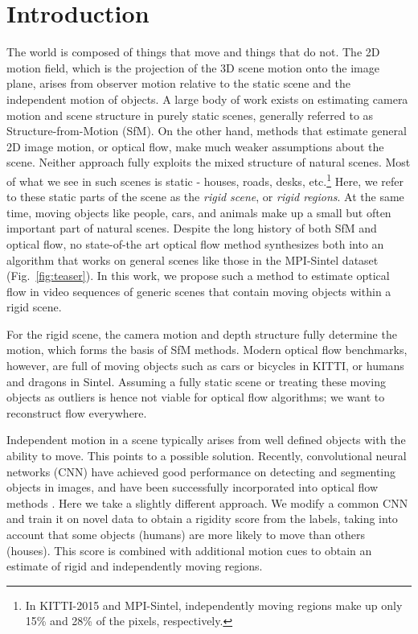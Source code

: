 \documentclass[10pt,twocolumn,letterpaper]{article}
\begin{document}
 \section{Introduction}
\noindent
The world is composed of things that move and things that do not.
The 2D motion field, which is the projection of the 3D scene motion onto the image plane, arises from observer motion relative to the static scene and the independent motion of objects.
A large body of work exists on estimating camera motion and scene structure in purely static scenes,
generally referred to as Structure-from-Motion (SfM).
On the other hand, methods that estimate general 2D image motion, or optical flow, make much weaker assumptions about the scene. Neither approach fully exploits the mixed structure of natural scenes.
Most of what we see in such scenes is static - houses, roads, desks, etc.\footnote{In KITTI-2015 and MPI-Sintel, independently moving regions make up only 15\% and 28\% of the pixels, respectively.}
Here, we refer to these static parts of the scene as the \textit{rigid scene}, or \textit{rigid regions}.
At the same time, moving objects like people, cars, and animals make up a small but often important part of natural scenes.
Despite the long history of both SfM and optical flow, no state-of-the art optical flow method synthesizes both into an algorithm that works on general scenes like those in the MPI-Sintel dataset \cite{Butler:ECCV:Sintel} (Fig.~\ref{fig:teaser}).
In this work, we propose such a method to estimate 
optical flow in video sequences
of generic scenes that contain moving objects within a rigid scene.


For the rigid scene, the camera motion and depth structure fully determine the motion, which forms the basis of SfM methods.
Modern optical flow benchmarks, however, are full of moving objects such as cars or bicycles in KITTI, or humans and dragons in Sintel.
Assuming a fully static scene or treating these moving objects as outliers is hence not viable for optical flow algorithms; we want to reconstruct flow everywhere.

Independent motion in a scene typically arises from well defined objects with the ability to move.  This points to a possible solution.
Recently, convolutional neural networks  (CNN) have achieved good performance on detecting and segmenting objects in images, and have been successfully incorporated into optical flow methods \cite{Bai:2016:SemanticDeepFlow,Sevilla:SOF}.
Here we take a slightly different approach.
We modify a common CNN and train it on novel data to obtain a rigidity score from the labels, taking into account that some objects (\eg humans) are more likely to move than others (\eg houses).
This score is combined with additional motion cues to obtain an estimate of rigid and independently moving regions.
\end{document}
